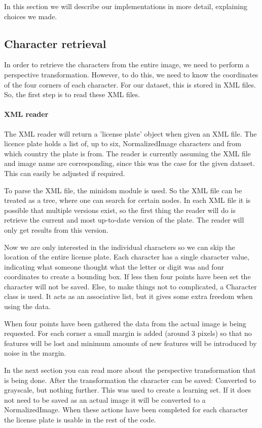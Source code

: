 \documentclass[a4paper]{article}
\begin{document}
In this section we will describe our implementations in more detail, explaining
choices we made.

\subsection{Character retrieval}

In order to retrieve the characters from the entire image, we need to
perform a perspective transformation. However, to do this, we need to know the 
coordinates of the four corners of each character. For our dataset, this is
stored in XML files. So, the first step is to read these XML files.

\paragraph*{XML reader}

The XML reader will return a 'license plate' object when given an XML file. The
licence plate holds a list of, up to six, NormalizedImage characters and from
which country the plate is from. The reader is currently assuming the XML file
and image name are corresponding, since this was the case for the given
dataset. This can easily be adjusted if required. 

To parse the XML file, the minidom module is used. So the XML file can be
treated as a tree, where one can search for certain nodes. In each XML
file it is possible that multiple versions exist, so the first thing the reader
will do is retrieve the current and most up-to-date version of the plate. The
reader will only get results from this version.

Now we are only interested in the individual characters so we can skip the
location of the entire license plate. Each character has 
a single character value, indicating what someone thought what the letter or
digit was and four coordinates to create a bounding box. If less then four
points have been set the character will not be saved. Else, to make things not
to complicated, a Character class is used. It acts as an associative list, but
it gives some extra freedom when using the data.

When four points have been gathered the data from the actual image is being
requested. For each corner a small margin is added (around 3 pixels) so that no
features will be lost and minimum amounts of new features will be introduced by
noise in the margin. 

In the next section you can read more about the perspective transformation that
is being done. After the transformation the character can be saved: Converted
to grayscale, but nothing further. This was used to create a learning set. If
it does not need to be saved as an actual image it will be converted to a
NormalizedImage. When these actions have been completed for each character the
license plate is usable in the rest of the code.
\end{document}
